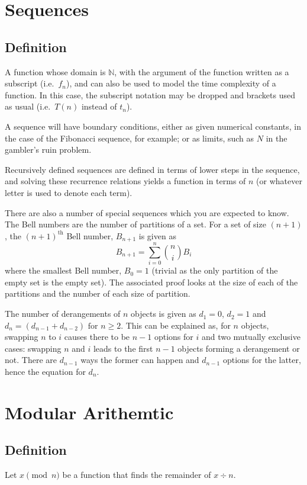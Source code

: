 \documentclass[10pt]{article}
\begin{document}
\section{Sequences}
\subsection{Definition}
A function whose domain is $\mathbb N$, with the argument of the function written as a subscript (i.e.~$f_n$), and can also be used to model the time complexity of a function.  In this case, the subscript notation may be dropped and brackets used as usual (i.e.~$T(n)$ instead of $t_n$).

A sequence will have boundary conditions, either as given numerical constants, in the case of the Fibonacci sequence, for example; or as limits, such as $N$ in the gambler's ruin problem.

Recursively defined sequences are defined in terms of lower steps in the sequence, and solving these recurrence relations yields a function in terms of $n$ (or whatever letter is used to denote each term).

There are also a number of special sequences which you are expected to know.  The Bell numbers are the number of partitions of a set.  For a set of size $(n+1)$, the $(n+1)^{\text{th}}$ Bell number, $B_{n+1}$ is given as \[B_{n+1}=\sum_{i=0}^n\binom niB_i\]where the smallest Bell number, $B_0=1$ (trivial as the only partition of the empty set is the empty set).  The associated proof looks at the size of each of the partitions and the number of each size of partition.

The number of derangements of $n$ objects is given as $d_1=0$, $d_2=1$ and $d_n=\left(d_{n-1}+d_{n-2}\right)\text{ for }n\ge2$.  This can be explained as, for $n$ objects, swapping $n$ to $i$ causes there to be $n-1$ options for $i$ and two mutually exclusive cases:  swapping $n$ and $i$ leads to the first $n-1$ objects forming a derangement or not.  There are $d_{n-1}$ ways the former can happen and $d_{n-1}$ options for the latter, hence the equation for $d_n$.
\section{Modular Arithemtic}
\subsection{Definition}
Let $x\pmod n $ be a function that finds the remainder of $x\div n$.
\end{document}
